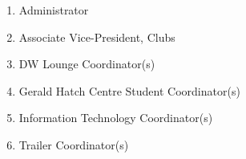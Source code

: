 \begin{enumerate}
  \begin{enumerate}
   \item
    Administrator
   \item
    Associate Vice-President, Clubs
   \item
    DW Lounge Coordinator(s)
   \item
    Gerald Hatch Centre Student Coordinator(s)
   \item
    Information Technology Coordinator(s)
   \item
    Trailer Coordinator(s)

  \end{enumerate}
\end{enumerate}